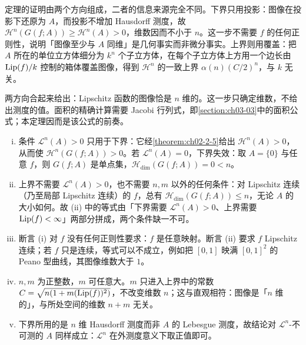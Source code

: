 \documentclass[../../main.tex]{subfiles}%
\begin{document}
\begin{remark}\label{remark:ch02-thm-2-9-动机}
定理的证明由两个方向组成，二者的信息来源完全不同。下界只用投影：图像在投影下还原为 $A$，而投影不增加 Hausdorff 测度，故 $\mathcal{H}^n(G(f;A))\geqslant\mathcal{H}^n(A)>0$，维数因而不小于 $n$。这一步不需要 $f$ 的任何正则性，说明「图像至少与 $A$ 同维」是几何事实而非微分事实。上界则用覆盖：把 $A$ 所在的单位立方体细分为 $k^n$ 个子立方体，在每个子立方体上方用一个边长由 $\operatorname{Lip}(f)/k$ 控制的箱体覆盖图像，得到 $\mathcal{H}^n$ 的一致上界 $\alpha(n)(C/2)^n$，与 $k$ 无关。

两方向合起来给出：Lipschitz 函数的图像恰是 $n$ 维的。这一步只确定维数，不给出测度的值。面积的精确计算需要 Jacobi 行列式，即\cref{section:ch03-03}中的面积公式；本定理因而是该公式的前奏。%
\end{remark}

\begin{remark}\label{remark:ch02-thm-2-9-条件}
\begin{enumerate}[(i)]
\item 条件 $\mathcal{L}^n(A)>0$ 只用于下界：它经\cref{theorem:ch02-2-5}给出 $\mathcal{H}^n(A)>0$，从而使 $\mathcal{H}^n(G(f;A))>0$。若 $\mathcal{L}^n(A)=0$，下界失效：取 $A=\{0\}$ 与任意 $f$，则 $G(f;A)$ 是单点集，$\mathcal{H}_{\dim}(G(f;A))=0<n$。%
\item 上界不需要 $\mathcal{L}^n(A)>0$，也不需要 $n,m$ 以外的任何条件：对 Lipschitz 连续（乃至局部 Lipschitz 连续）的 $f$，总有 $\mathcal{H}_{\dim}(G(f;A))\leqslant n$，无论 $A$ 的大小如何。故 (ii) 中的等式由「下界需要 $\mathcal{L}^n(A)>0$、上界需要 $\operatorname{Lip}(f)<\infty$」两部分拼成，两个条件缺一不可。
\item 断言 (i) 对 $f$ 没有任何正则性要求：$f$ 是任意映射。断言 (ii) 要求 $f$ Lipschitz 连续；若 $f$ 只是连续，等式可以不成立，例如把 $[0,1]$ 映满 $[0,1]^2$ 的 Peano 型曲线，其图像维数大于 $1$。
\item $n,m$ 为正整数，$m$ 可任意大。$m$ 只进入上界中的常数 $C=\sqrt{n(1+m(\operatorname{Lip}(f))^2)}$，不改变维数 $n$；这与直观相符：图像是「$n$ 维的」，与所处空间的维数 $n+m$ 无关。
\item 下界所用的是 $n$ 维 Hausdorff 测度而非 $A$ 的 Lebesgue 测度，故结论对 $\mathcal{L}^n$-不可测的 $A$ 同样成立：$\mathcal{L}^n$ 在外测度意义下取正值即可。
\end{enumerate}
\end{remark}
\end{document}
